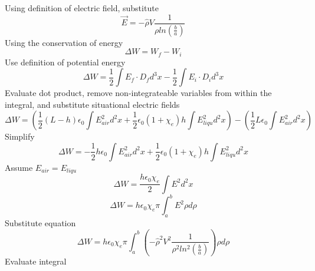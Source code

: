 \documentclass[12pt]{article}
\begin{document}
    Using definition of electric field, substitute
    \begin{equation} \label{eq: 3-9}
        \vec{E}         = - \hat{\rho} V \frac{1}{\rho ln(\frac{b}{a})}
    \end{equation}
    Using the conservation of energy
    \begin{equation} \label{eq: 3-10}
        \Delta W = W_f - W_i
    \end{equation}
    Use definition of potential energy
    \begin{equation} \label{eq: 3-11}
        \Delta W = \frac{1}{2} \int E_f \cdot D_f d^3x - \frac{1}{2} \int E_i \cdot D_i d^3x
    \end{equation}
    Evaluate dot product, remove non-integrateable variables from within the integral, and substitute situational electric fields
    \begin{equation} \label{eq: 3-12}
        \Delta W = \left(\frac{1}{2} (L-h) \epsilon_0 \int E_{air}^2 d^2x + \frac{1}{2}\epsilon_0 (1+\chi_e)h \int E_{liqu}^2 d^2x \right) - \left(\frac{1}{2} L \epsilon_0 \int E_{air}^2 d^2x \right) 
    \end{equation}
    Simplify
    \begin{equation} \label{eq: 3-13}
        \Delta W = - \frac{1}{2} h \epsilon_0 \int E_{air}^2 d^2x + \frac{1}{2} \epsilon_0 (1+\chi_e) h \int E_{liqu}^2 d^2x
    \end{equation}
    Assume $E_{air}=E_{liqu}$
    \begin{equation} \label{eq: 3-14}
        \Delta W = \frac{h \epsilon_0 \chi_e}{2} \int E^2 d^2x
    \end{equation}
    \begin{equation} \label{eq: 3-15}
        \Delta W = h \epsilon_0 \chi_e \pi \int_a^b E^2 \rho d\rho 
    \end{equation}
    Substitute equation
    \begin{equation} \label{eq: 3-16}
        \Delta W = h \epsilon_0 \chi_e \pi \int_a^b \left(-\hat{\rho}^2 V^2 \frac{1}{\rho^2 ln^2(\frac{b}{a})} \right) \rho d\rho 
    \end{equation}
    Evaluate integral 
\end{document}
